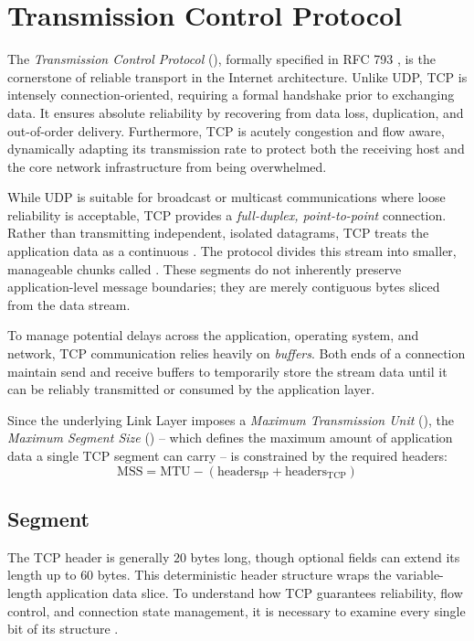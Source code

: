 \section{Transmission Control Protocol}
The \emph{Transmission Control Protocol} (), formally specified in RFC 793 \cite{rfc793}, is the cornerstone of reliable transport in the Internet architecture. 
Unlike UDP, TCP is intensely connection-oriented, requiring a formal handshake prior to exchanging data. It ensures absolute reliability by recovering from data loss, duplication, and out-of-order delivery. Furthermore, TCP is acutely congestion and flow aware, dynamically adapting its transmission rate to protect both the receiving host and the core network infrastructure from being overwhelmed.

While UDP is suitable for broadcast or multicast communications where loose reliability is acceptable, TCP provides a \emph{full-duplex, point-to-point} connection.
Rather than transmitting independent, isolated datagrams, TCP treats the application data as a continuous . The protocol divides this stream into smaller, manageable chunks called . These segments do not inherently preserve application-level message boundaries; they are merely contiguous bytes sliced from the data stream.

To manage potential delays across the application, operating system, and network, TCP communication relies heavily on \emph{buffers}. Both ends of a connection maintain send and receive buffers to temporarily store the stream data until it can be reliably transmitted or consumed by the application layer.

Since the underlying Link Layer imposes a \emph{Maximum Transmission Unit} (), the \emph{Maximum Segment Size} () -- which defines the maximum amount of application data a single TCP segment can carry -- is constrained by the required headers:
\[
\text{MSS} = \text{MTU} - (\text{headers}_{\text{IP}} + \text{headers}_{\text{TCP}})
\]

\subsection{Segment}
The TCP header is generally \( 20 \) bytes long, though optional fields can extend its length up to \( 60 \) bytes. This deterministic header structure wraps the variable-length application data slice. To understand how TCP guarantees reliability, flow control, and connection state management, it is necessary to examine every single bit of its structure \cite{rfc9293}.

